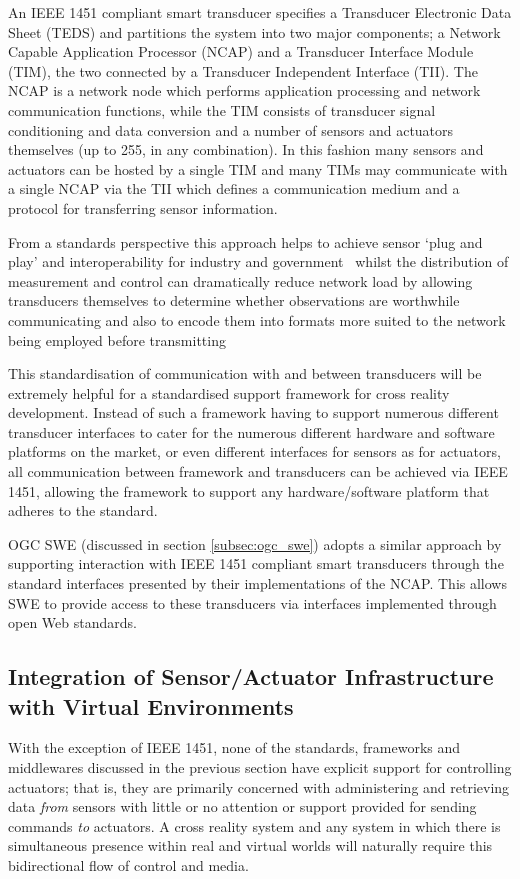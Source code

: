 An IEEE 1451 compliant smart transducer specifies a Transducer Electronic Data Sheet (TEDS) and partitions the system into two major components; a Network Capable Application Processor (NCAP) and a Transducer Interface Module (TIM), the two connected by a Transducer Independent Interface (TII). The NCAP is a network node which performs application processing and network communication functions, while the TIM consists of transducer signal conditioning and data conversion and a number of sensors and actuators themselves (up to 255, in any combination). In this fashion many sensors and actuators can be hosted by a single TIM and many TIMs may communicate with a single NCAP via the TII which defines a communication medium and a protocol for transferring sensor information.

From a standards perspective this approach helps to achieve sensor `plug and play' and interoperability for industry and government~\cite{Song2008} whilst the distribution of measurement and control can dramatically reduce network load by allowing transducers themselves to determine whether observations are worthwhile communicating and also to encode them into formats more suited to the network being employed before transmitting~\cite{lee:distributed}

This standardisation of communication with and between transducers will be extremely helpful for a standardised support framework for cross reality development. Instead of such a framework having to support numerous different transducer interfaces to cater for the numerous different hardware and software platforms on the market, or even different interfaces for sensors as for actuators, all communication between framework and transducers can be achieved via IEEE 1451, allowing the framework to support any hardware/software platform that adheres to the standard.

OGC SWE (discussed in section \ref{subsec:ogc_swe}) adopts a similar approach by supporting interaction with IEEE 1451 compliant smart transducers through the standard interfaces presented by their implementations of the NCAP. This allows SWE to provide access to these transducers via interfaces implemented through open Web standards.

\subsection{Integration of Sensor/Actuator Infrastructure with Virtual Environments}
With the exception of IEEE 1451, none of the standards, frameworks and middlewares discussed in the previous section have explicit support for controlling actuators; that is, they are primarily concerned with administering and retrieving data \textit{from} sensors with little or no attention or support provided for sending commands \textit{to} actuators. A cross reality system and any system in which there is simultaneous presence within real and virtual worlds will naturally require this bidirectional flow of control and media.

